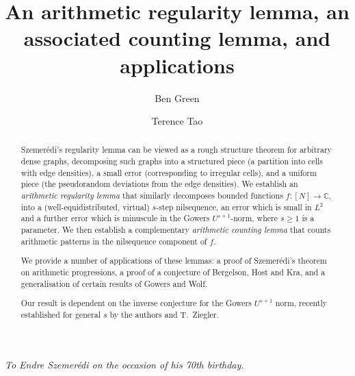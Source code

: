 \documentclass[11pt,reqno]{amsart}
\numberwithin{equation}{section}
\theoremstyle{plain}
\theoremstyle{definition}
\renewcommand{\geq}{\geqslant}
\newcommand\C{\mathbb{C}}
\newcommand\1{{\bf 1}}
\newcommand\2{{\bf 2}}
\begin{document}
\title[Arithmetic regularity and counting lemmas]{An arithmetic regularity lemma, an associated counting lemma, and applications}
\author{Ben Green}
\address{Centre for Mathematical Sciences\\
Wilberforce Road\\
Cambridge CB3 0WA\\
England }
\author{Terence Tao}
\address{Department of Mathematics\\
UCLA\\
Los Angeles, CA 90095\\
USA}

\subjclass{}

\begin{abstract} Szemer\'edi's regularity lemma can be viewed as a rough structure theorem for arbitrary dense graphs, decomposing such graphs into a structured piece (a partition into cells with edge densities), a small error (corresponding to irregular cells), and a uniform piece (the pseudorandom deviations from the edge densities). We establish an \emph{arithmetic regularity lemma} that similarly decomposes bounded functions $f : [N] \rightarrow \C$, into a (well-equidistributed, virtual) $s$-step nilsequence, an error which is small in $L^2$ and a further error which is minuscule in the Gowers $U^{s+1}$-norm, where $s \geq 1$ is a parameter. We then establish a complementary \emph{arithmetic counting lemma} that counts arithmetic patterns in the nilsequence component of $f$.

We provide a number of applications of these lemmas: a proof of Szemer\'edi's theorem on arithmetic progressions, a proof of a conjecture of Bergelson, Host and Kra, and a generalisation of certain results of Gowers and Wolf.

Our result is dependent on the inverse conjecture for the Gowers $U^{s+1}$ norm, recently established for general $s$ by the authors and T.~Ziegler.
\end{abstract}

\maketitle

\begin{center}
\emph{To Endre Szemer\'edi on the occasion of his 70th birthday.}
\end{center}

\tableofcontents
\end{document}
